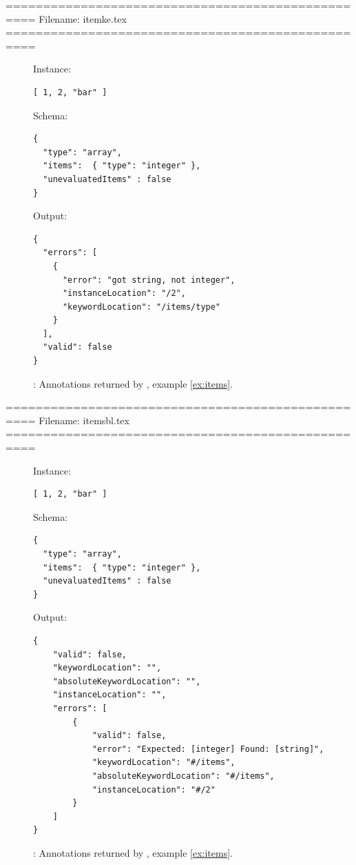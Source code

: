 ==================================================
Filename: itemke.tex
==================================================
\begin{figure}
\small

Instance:
\begin{querybox}{}
\begin{lstlisting}[style=querynonumbers]
[ 1, 2, "bar" ]
\end{lstlisting}
\end{querybox}

Schema:
\begin{querybox}{}
\begin{lstlisting}[style=query]
{
  "type": "array",
  "items":  { "type": "integer" }, 
  "unevaluatedItems" : false
}
\end{lstlisting}
\end{querybox}

Output:
\begin{querybox}{}
\begin{lstlisting}[style=query]
{
  "errors": [
    {
      "error": "got string, not integer",
      "instanceLocation": "/2",
      "keywordLocation": "/items/type"
    }
  ],
  "valid": false
}
\end{lstlisting}
\end{querybox}

\caption{{\qits}: Annotations returned by {\KE}, example \ref{ex:items}.}
\label{fig:itemje}
\end{figure}



==================================================
Filename: itemsbl.tex
==================================================
\begin{figure}
\small

Instance:
\begin{querybox}{}
\begin{lstlisting}[style=querynonumbers]
[ 1, 2, "bar" ]
\end{lstlisting}
\end{querybox}

Schema:
\begin{querybox}{}
\begin{lstlisting}[style=query]
{
  "type": "array",
  "items":  { "type": "integer" }, 
  "unevaluatedItems" : false
}
\end{lstlisting}
\end{querybox}

Output:
\begin{querybox}{}
\begin{lstlisting}[style=query]
{
	"valid": false,
	"keywordLocation": "",
	"absoluteKeywordLocation": "",
	"instanceLocation": "",
	"errors": [
		{
			"valid": false,
			"error": "Expected: [integer] Found: [string]",
			"keywordLocation": "#/items",
			"absoluteKeywordLocation": "#/items",
			"instanceLocation": "#/2"
		}
	]
}
\end{lstlisting}
\end{querybox}

\caption{{\qits}: Annotations returned by {\BL}, example \ref{ex:items}.}
\label{fig:itembl}
\end{figure}



